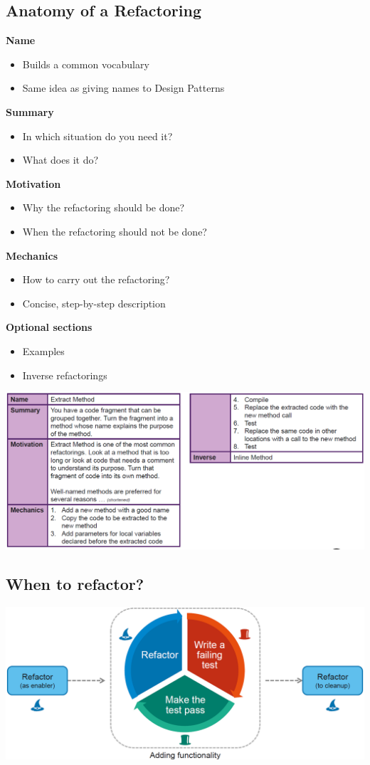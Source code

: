 \subsection{Anatomy of a Refactoring}
\textbf{Name}
\begin{itemize}
    \item Builds a common vocabulary
    \item Same idea as giving names to Design Patterns
\end{itemize}
\textbf{Summary}
\begin{itemize}
    \item In which situation do you need it?
    \item What does it do?
\end{itemize}
\textbf{Motivation}
\begin{itemize}
    \item Why the refactoring should be done?
    \item When the refactoring should not be done?
\end{itemize}
\textbf{Mechanics}
\begin{itemize}
    \item How to carry out the refactoring?
    \item Concise, step-by-step description
\end{itemize}
\textbf{Optional sections}
\begin{itemize}
    \item Examples
    \item Inverse refactorings
\end{itemize}
\includegraphics[width=\linewidth]{../img/refactoring_example.png}

\subsection{When to refactor?}
\includegraphics[width=\linewidth]{../img/refactoring_process.png}

